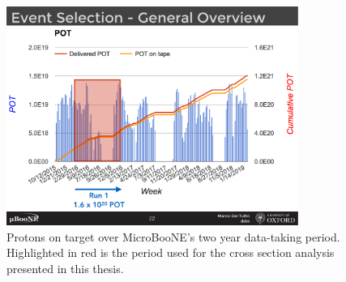 \begin{figure}[t]
\centering
\includegraphics[width=0.85\textwidth]{images/MicroBooNE/run1}
\caption[Protons on Target over MicroBooNE Data-Taking Period]{Protons on target over MicroBooNE's two year data-taking period. Highlighted in red is the period used for the cross section analysis presented in this thesis.}
\label{fig:run1}
\end{figure}

